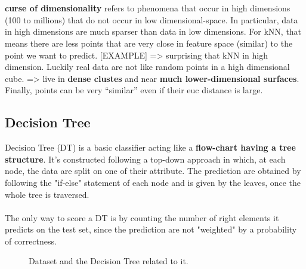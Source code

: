\\\\
\textbf{curse of dimensionality} refers to phenomena that occur in high dimensions (100 to millions) that do not occur in low dimensional-space. In particular, data in high dimensions are much sparser than data in low dimensions. For kNN, that means there are less points that are very close in feature space (similar) to the point we want to predict. [EXAMPLE] => surprising that kNN in high dimension. Luckily real data are not like random points in a high dimensional cube. => live in \textbf{dense clustes} and near \textbf{much lower-dimensional surfaces}. Finally, points can be very ``similar'' even if their euc distance is large.


\subsection{Decision Tree}

Decision Tree (DT) is a basic classifier acting like a \textbf{flow-chart having a tree structure}. It's constructed following a top-down approach in which, at each node, the data are split on one of their attribute. The prediction are obtained by following the "if-else" statement of each node and is given by the leaves, once the whole tree is traversed.
\\\\
The only way to score a DT is by counting the number of right elements it predicts on the test set, since the prediction are not "weighted" by a probability of correctness.

\begin{figure}[H] %
\centerline{
}
\caption{\label{DT} 
Dataset and the Decision Tree related to it.
}
\end{figure}


